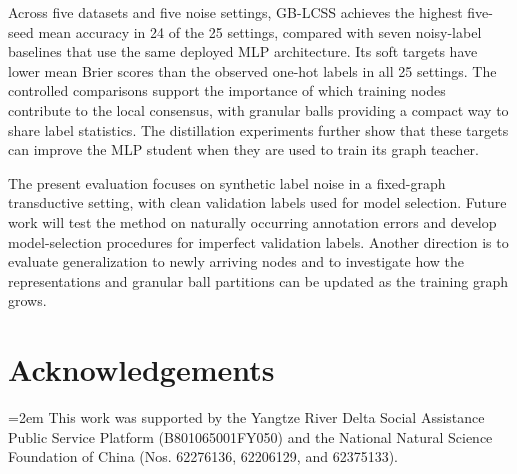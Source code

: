 \documentclass[times,review,10pt]{elsarticle}
\theoremstyle{definition}
\theoremstyle{plain}
\begin{document}
Across five datasets and five noise settings, GB-LCSS achieves the highest five-seed mean accuracy in 24 of the 25 settings, compared with seven noisy-label baselines that use the same deployed MLP architecture. Its soft targets have lower mean Brier scores than the observed one-hot labels in all 25 settings. The controlled comparisons support the importance of which training nodes contribute to the local consensus, with granular balls providing a compact way to share label statistics. The distillation experiments further show that these targets can improve the MLP student when they are used to train its graph teacher.

The present evaluation focuses on synthetic label noise in a fixed-graph transductive setting, with clean validation labels used for model selection. Future work will test the method on naturally occurring annotation errors and develop model-selection procedures for imperfect validation labels. Another direction is to evaluate generalization to newly arriving nodes and to investigate how the representations and granular ball partitions can be updated as the training graph grows.
\section*{Acknowledgements}

\begingroup
\emergencystretch=2em
This work was supported by the Yangtze River Delta Social Assistance Public Service Platform (B801065001FY050)
and the National Natural Science Foundation of China (Nos. 62276136, 62206129, and 62375133).\par
\endgroup

\setlength{\bibsep}{0.5pt plus 0.2pt minus 0.2pt}



\end{document}
